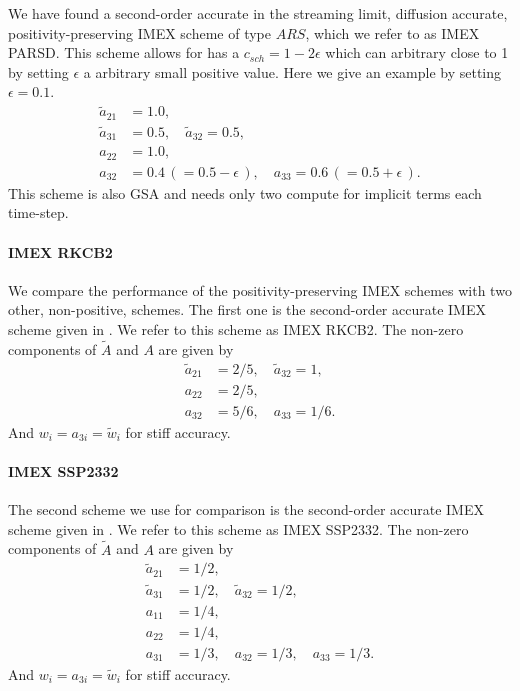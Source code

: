 We have found a second-order accurate in the streaming limit, diffusion accurate, positivity-preserving IMEX scheme of type $ARS$, which we refer to as IMEX PARSD.  
This scheme allows for has a $c_{sch}= 1 - 2\epsilon$ which can arbitrary close to 1 by setting $\epsilon$ a arbitrary small positive value.
Here we give an example by setting $\epsilon=0.1$.
\begin{align}
  \tilde{a}_{21} & = 1.0, \nonumber \\
  \tilde{a}_{31} & = 0.5, \quad \tilde{a}_{32} = 0.5, \nonumber \\
  a_{22} & = 1.0, \nonumber \\
  a_{32} & = 0.4 \,( = 0.5 - \epsilon\,), \quad a_{33} = 0.6 \,( = 0.5 + \epsilon\,). \nonumber
\end{align} 
This scheme is also GSA and needs only two compute for implicit terms each time-step.

\paragraph{IMEX RKCB2}

We compare the performance of the positivity-preserving IMEX schemes with two other, non-positive, schemes.  
The first one is the second-order accurate IMEX scheme given in \cite{cavaglieriBewley2015}.  
We refer to this scheme as IMEX RKCB2.  
The non-zero components of $\tilde{A}$ and $A$ are given by
\begin{align}
  \tilde{a}_{21} &= 2/5, \quad \tilde{a}_{32} = 1, \nonumber \\
  a_{22} &= 2/5, \nonumber \\
  a_{32} &= 5/6, \quad a_{33} = 1/6. \nonumber
\end{align}
And $w_{i} = a_{3i} = \tilde{w}_{i}$ for stiff accuracy.

\paragraph{IMEX SSP2332}

The second scheme we use for comparison is the second-order accurate IMEX scheme given in \cite{pareschiRusso_2005}.  
We refer to this scheme as IMEX SSP2332.  
The non-zero components of $\tilde{A}$ and $A$ are given by
\begin{align}
  \tilde{a}_{21} &= 1/2, \nonumber \\
  \tilde{a}_{31} &= 1/2, \quad \tilde{a}_{32} = 1/2, \nonumber \\
  a_{11} &= 1/4, \nonumber \\
  a_{22} &= 1/4, \nonumber \\
  a_{31} &= 1/3, \quad a_{32} = 1/3, \quad a_{33} = 1/3. \nonumber
\end{align}
And $w_{i} = a_{3i} = \tilde{w}_{i}$ for stiff accuracy.

